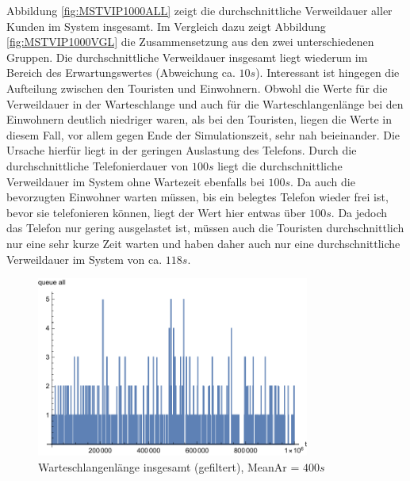 Abbildung \ref{fig:MSTVIP1000ALL} zeigt die durchschnittliche Verweildauer aller Kunden im System insgesamt. Im Vergleich dazu zeigt Abbildung \ref{fig:MSTVIP1000VGL} die Zusammensetzung aus den zwei unterschiedenen Gruppen. Die durchschnittliche Verweildauer insgesamt liegt wiederum im Bereich des Erwartungswertes (Abweichung ca. $10s$). Interessant ist hingegen die Aufteilung zwischen den Touristen und Einwohnern. Obwohl die Werte für die Verweildauer in der Warteschlange und auch für die Warteschlangenlänge bei den Einwohnern deutlich niedriger waren, als bei den Touristen, liegen die Werte in diesem Fall, vor allem gegen Ende der Simulationszeit, sehr nah beieinander. Die Ursache hierfür liegt in der geringen Auslastung des Telefons. Durch die durchschnittliche Telefonierdauer von $100s$ liegt die durchschnittliche Verweildauer im System ohne Wartezeit ebenfalls bei $100s$. Da auch die bevorzugten Einwohner warten müssen, bis ein belegtes Telefon wieder frei ist, bevor sie telefonieren können, liegt der Wert hier entwas über $100s$. Da jedoch das Telefon nur gering ausgelastet ist, müssen auch die Touristen durchschnittlich nur eine sehr kurze Zeit warten und haben daher auch nur eine durchschnittliche Verweildauer im System von ca. $118s$. 

\begin{figure}[htpb]
	\centering
	\includegraphics[width=0.8\textwidth]{abbildungen/1_Phone_VIP/Arrival_400_Serve_100_dur_1000000_Skip_0/QueueStepPlotAllFiltered.pdf}
	\caption{Warteschlangenlänge insgesamt (gefiltert), MeanAr = $400s$}
	\label{fig:QSPALL400}
\end{figure}

